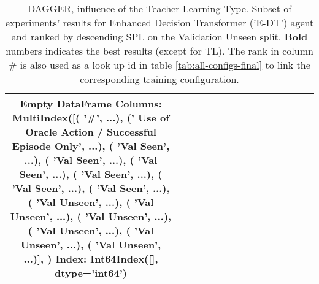 \begin{table}
\centering
\caption{\label{tab:e_dt_dagger_pe_oa}DAGGER, influence of the Teacher Learning Type. Subset of experiments' results for Enhanced Decision Transformer ('E-DT') agent and ranked by descending SPL on the Validation Unseen split. \textbf{Bold} numbers indicates the best results (except for TL). The rank in column \# is also used as a look up id in table \ref{tab:all-configs-final} to link the corresponding training configuration.}
\begin{tabular}{@{\hskip3pt}c@{\hskip3pt}c@{\hskip3pt}c@{\hskip3pt}c@{\hskip3pt}c@{\hskip3pt}c@{\hskip3pt}c@{\hskip3pt}c@{\hskip3pt}c@{\hskip3pt}c@{\hskip3pt}c@{\hskip3pt}c@{\hskip3pt}c@{\hskip3pt}c@{\hskip3pt}c}
\toprule
Empty DataFrame
Columns: MultiIndex([(                                             '\textbf{\#}', ...),
            ('\textbf{ Use of Oracle Action / Successful Episode Only}', ...),
            (                                       '\textbf{Val Seen}', ...),
            (                                       '\textbf{Val Seen}', ...),
            (                                       '\textbf{Val Seen}', ...),
            (                                       '\textbf{Val Seen}', ...),
            (                                       '\textbf{Val Seen}', ...),
            (                                       '\textbf{Val Seen}', ...),
            (                                     '\textbf{Val Unseen}', ...),
            (                                     '\textbf{Val Unseen}', ...),
            (                                     '\textbf{Val Unseen}', ...),
            (                                     '\textbf{Val Unseen}', ...),
            (                                     '\textbf{Val Unseen}', ...),
            (                                     '\textbf{Val Unseen}', ...)],
           )
Index: Int64Index([], dtype='int64') \\
\bottomrule
\end{tabular}
\end{table}
